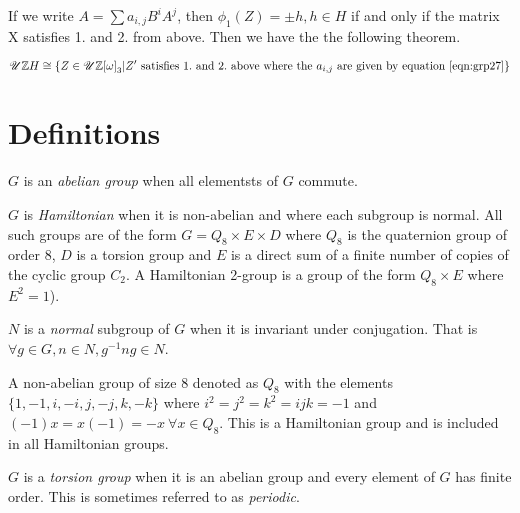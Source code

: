 \documentclass[11pt]{report}
\begin{document}
If we write $A = \sum a_{i,j}B^iA^j$, then $\phi_1(Z) = \pm h, 
h \in H$  if and only if the matrix X satisfies 1. and 2.
from above. Then we have the the following theorem.

\begin{theorem}
\begin{equation*}
\mathscr{U}{ \mathbb{Z}H} \cong
\left\{Z \in \mathscr{U}{ \mathbb{Z}[\omega]}_3 |
Z' \mathrm{\ satisfies\ 1.\ and\ 2.\ above\ where\ the\ }a_{i,j}
\mathrm{\ are\ given\ by\ equation\ }\ref{eqn:grp27}
\right\}
\end{equation*}
\end{theorem}
\appendix
\chapter{Definitions}
\begin{definition}\label{defn:abelianGroup}
 $G$ is an \emph{abelian group} when all elementsts of $G$ commute.
\end{definition}
\begin{definition}\label{defn:hamiltonianGroup}
$G$ is \emph{Hamiltonian} when it is non-abelian and where each subgroup is
normal.  All such groups are of the form $G = Q_8 \times E \times D$ where
$Q_8$ is the quaternion group of order 8, $D$ is a torsion group and $E$ is a
direct sum of a finite number of copies of the cyclic group $C_2$.
A Hamiltonian 2-group is a group of the 
form $Q_8 \times E $ where \(E^2 = 1\)).
\end{definition}
\begin{definition}\label{defn:normalSubGroup}
$N$ is a \emph{normal} subgroup of $G$ when it is invariant under conjugation. 
That is $\forall g\in G, n\in N, g^{-1}ng \in N$.
\end{definition}
\begin{definition}\label{defn:quaternionGroup}
A non-abelian group of size 8 denoted as $Q_8$ 
with the elements $\{1, -1, i, -i, j, -j, k, -k\}$
 where $i^2 = j^2 = k^2 = ijk = -1$ 
and $(-1)x = x(-1) = -x\ \forall x \in Q_8$. This is a Hamiltonian group 
and is included in all Hamiltonian groups.
\end{definition}
\begin{definition}\label{defn:torsionGroup}
 $G$ is a \emph{torsion group} when it is an abelian group and
every element of $G$ has 
finite order. This is sometimes referred to as \emph{periodic}.
\end{definition}




\end{document}
